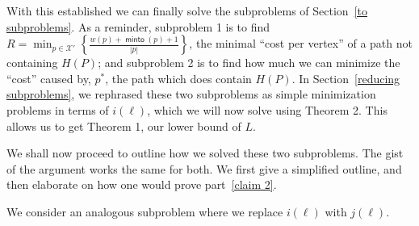 \documentclass{article}
\DeclareMathOperator{\minto}{\bm{\mathsf{minto}}}
\newcommand{\edit}[1]{}%
\begin{document}
With this established we can finally solve the subproblems of Section~\ref{to subproblems}. As a reminder, subproblem 1 is to find $R = \min_{p \in \mathcal{X}'}\left\{\frac{w(p)+\minto(p)+1}{|p|}\right\}$, the minimal ``cost per vertex'' of a path not containing $H(P)$; and subproblem 2 is to find how much we can minimize the ``cost'' caused by, $p^*$, the path which does contain $H(P)$. In Section~\ref{reducing subproblems}, we rephrased these two subproblems as simple minimization problems in terms of $i(\ell)$, which we will now solve using Theorem 2.\edit{ref} This allows us to get Theorem 1, our lower bound of $L$.\edit{ ref}

 We shall now proceed to outline how we solved these two subproblems. The gist of the argument works the same for both. We first give a simplified outline, and then elaborate on how one would prove part~\ref{claim 2}.
 
 \vspace{1.75em}
 
We consider an analogous subproblem where we replace $i(\ell)$ with $j(\ell)$.
\end{document}
